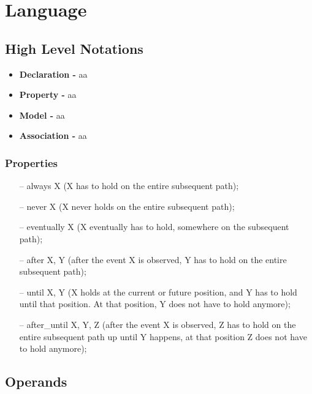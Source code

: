 \chapter{Language}
\label{chap:language}

\section{High Level Notations}

\begin{itemize}
\item \textbf{Declaration -} aa
\item \textbf{Property -} aa
\item \textbf{Model -} aa
\item \textbf{Association -} aa
\end{itemize}

\subsection{Properties}

\begin{itemize}
\item[--] always X (X has to hold on the entire subsequent path);
\item[--] never X (X never holds on the entire subsequent path);
\item[--] eventually X (X eventually has to hold, somewhere on the subsequent path);
\item[--] after X, Y (after the event X is observed, Y has to hold on the entire subsequent path);
\item[--] until X, Y (X holds at the current or future position, and Y has to hold until that position. At that position, Y does not have to hold anymore);
\item[--] after\_until X, Y, Z (after the event X is observed, Z has to hold on the entire subsequent path up until Y happens, at that position Z does not have to hold anymore);
\end{itemize}

\section{Operands}

